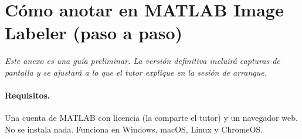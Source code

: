 \documentclass[12pt,letterpaper]{article}
\begin{document}
\appendix
\section{Cómo anotar en MATLAB Image Labeler (paso a paso)}
\label{anexo:matlab}

\textit{Este anexo es una guía preliminar. La versión definitiva incluirá capturas de pantalla y se
ajustará a lo que el tutor explique en la sesión de arranque.}

\paragraph{Requisitos.} Una cuenta de MATLAB con licencia (la comparte el tutor) y un navegador web.
No se instala nada. Funciona en Windows, macOS, Linux y ChromeOS.
\end{document}
